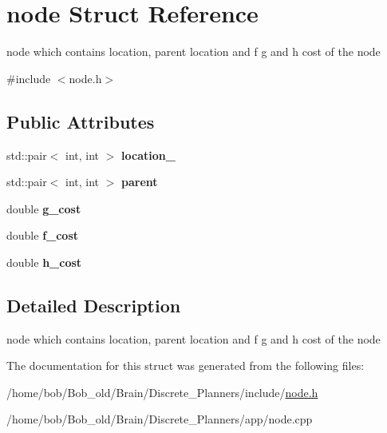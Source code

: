 \hypertarget{structnode}{}\section{node Struct Reference}
\label{structnode}


node which contains location, parent location and f g and h cost of the node  




{\ttfamily \#include $<$node.\+h$>$}

\subsection*{Public Attributes}
\begin{DoxyCompactItemize}
\item 
std\+::pair$<$ int, int $>$ {\bfseries location\+\_\+}\hypertarget{structnode_aec49942cb16018b007a5f4f8b1ed92f7}{}\label{structnode_aec49942cb16018b007a5f4f8b1ed92f7}

\item 
std\+::pair$<$ int, int $>$ {\bfseries parent}\hypertarget{structnode_a8521a90e9164e9e237f423db7e67988f}{}\label{structnode_a8521a90e9164e9e237f423db7e67988f}

\item 
double {\bfseries g\+\_\+cost}\hypertarget{structnode_ae2bca0303dfd57cc808bf54112057ca9}{}\label{structnode_ae2bca0303dfd57cc808bf54112057ca9}

\item 
double {\bfseries f\+\_\+cost}\hypertarget{structnode_a06dade3de13d5c31488cc7e65fa805dc}{}\label{structnode_a06dade3de13d5c31488cc7e65fa805dc}

\item 
double {\bfseries h\+\_\+cost}\hypertarget{structnode_a099b281e5e4c6cb4811383c252a09a28}{}\label{structnode_a099b281e5e4c6cb4811383c252a09a28}

\end{DoxyCompactItemize}


\subsection{Detailed Description}
node which contains location, parent location and f g and h cost of the node 

The documentation for this struct was generated from the following files\+:\begin{DoxyCompactItemize}
\item 
/home/bob/\+Bob\+\_\+old/\+Brain/\+Discrete\+\_\+\+Planners/include/\hyperlink{node_8h}{node.\+h}\item 
/home/bob/\+Bob\+\_\+old/\+Brain/\+Discrete\+\_\+\+Planners/app/node.\+cpp\end{DoxyCompactItemize}
